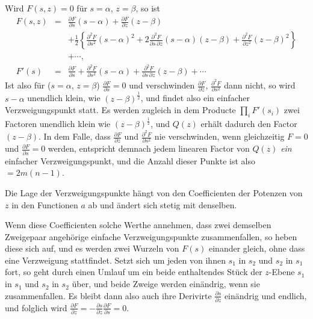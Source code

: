 \documentclass[a4paper,12pt,leqno]{article}
\begin{document}
Wird $F(s,z) = 0$ f\"{u}r $s = \alpha$, $z = \beta$, so ist
\begin{eqnarray*}
F(s,z) &=& \frac{\partial F}{\partial s}(s - \alpha)
           + \frac{\partial F}{\partial z}(z - \beta) \\
       & & + {\textstyle\frac{1}{2}}
               \left\{
                  \frac{\partial^2 F}{\partial s^2} (s - \alpha)^2
                + 2 \frac{\partial^2 F}{\partial s \, \partial z}
                     (s - \alpha) (z - \beta)
                + \frac{\partial^2 F}{\partial z^2} (z - \beta)^2
               \right\} \\
       & & + \cdots ,\\
F'(s)  &=& \frac{\partial F}{\partial s}
           + \frac{\partial^2 F}{\partial s^2}(s - \alpha)
           + \frac{\partial^2 F}{\partial s \, \partial z} (z - \beta)
           + \cdots
\end{eqnarray*}
Ist also f\"{u}r ($s = \alpha$, $z = \beta$)
$\displaystyle \frac{\partial F}{\partial s} = 0$
und verschwinden
$\displaystyle \frac{\partial F}{\partial z}$,
$\displaystyle \frac{\partial^2 F}{\partial s^2}$
dann nicht, so wird $s - \alpha$ unendlich klein, wie
$(z - \beta)^{\frac{1}{2}}$, und findet also ein einfacher
Verzweigungspunkt statt.  Es werden zugleich in dem Producte
$\prod\limits_i F'(s_i)$ zwei Factoren unendlich klein wie
$(z - \beta)^{\frac{1}{2}}$, und $Q(z)$ erh\"{a}lt dadurch den
Factor $(z - \beta)$.  In dem Falle, dass
$\displaystyle \frac{\partial F}{\partial z}$
und
$\displaystyle \frac{\partial^2 F}{\partial s^2}$
nie verschwinden, wenn gleichzeitig $F = 0$ und
$\displaystyle \frac{\partial F}{\partial s} = 0$
werden, entspricht demnach jedem linearen Factor von $Q(z)$
\emph{ein} einfacher Verzweigungspunkt, und die Anzahl dieser
Punkte ist also $= 2m(n - 1)$.

Die Lage der Verzweigungspunkte h\"{a}ngt von den Coefficienten
der Potenzen von $z$ in den Functionen $a$ ab und \"{a}ndert sich
stetig mit denselben.

Wenn diese Coefficienten solche Werthe annehmen, dass zwei
demselben Zweigepaar angeh\"{o}rige einfache Verzweigungspunkte
zusammenfallen, so heben diese sich auf, und es werden zwei
Wurzeln von $F(s)$ einander gleich, ohne dass eine Verzweigung
stattfindet.  Setzt sich um jeden von ihnen $s_1$ in $s_2$ und
$s_2$ in $s_1$ fort, so geht durch einen Umlauf um ein beide
enthaltendes St\"{u}ck der $z$-Ebene $s_1$ in $s_1$ und $s_2$ in
$s_2$ \"{u}ber, und beide Zweige werden ein\"{a}ndrig, wenn sie
zusammenfallen.  Es bleibt dann also auch ihre Derivirte
$\displaystyle\frac{\partial s}{\partial z}$
ein\"{a}ndrig und endlich, und folglich wird
$\displaystyle\frac{\partial F}{\partial z}
   = - \frac{\partial s}{\partial z} \frac{\partial F}{\partial s} = 0$.
\end{document}
